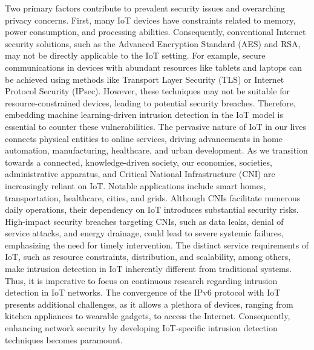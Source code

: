 Two primary factors contribute to prevalent security issues and overarching privacy concerns. First, many IoT devices have constraints related to memory, power consumption, and processing abilities. Consequently, conventional Internet security solutions, such as the Advanced Encryption Standard (AES) and RSA, may not be directly applicable to the IoT setting. For example, secure communications in devices with abundant resources like tablets and laptops can be achieved using methods like Transport Layer Security (TLS) or Internet Protocol Security (IPsec). However, these techniques may not be suitable for resource-constrained devices, leading to potential security breaches. Therefore, embedding machine learning-driven intrusion detection in the IoT model is essential to counter these vulnerabilities. The pervasive nature of IoT in our lives connects physical entities to online services, driving advancements in home automation, manufacturing, healthcare, and urban development. As we transition towards a connected, knowledge-driven society, our economies, societies, administrative apparatus, and Critical National Infrastructure (CNI) are increasingly reliant on IoT. Notable applications include smart homes, transportation, healthcare, cities, and grids. Although CNIs facilitate numerous daily operations, their dependency on IoT introduces substantial security risks. High-impact security breaches targeting CNIs, such as data leaks, denial of service attacks, and energy drainage, could lead to severe systemic failures, emphasizing the need for timely intervention. The distinct service requirements of IoT, such as resource constraints, distribution, and scalability, among others, make intrusion detection in IoT inherently different from traditional systems. Thus, it is imperative to focus on continuous research regarding intrusion detection in IoT networks. The convergence of the IPv6 protocol with IoT presents additional challenges, as it allows a plethora of devices, ranging from kitchen appliances to wearable gadgets, to access the Internet. Consequently, enhancing network security by developing IoT-specific intrusion detection techniques becomes paramount.

